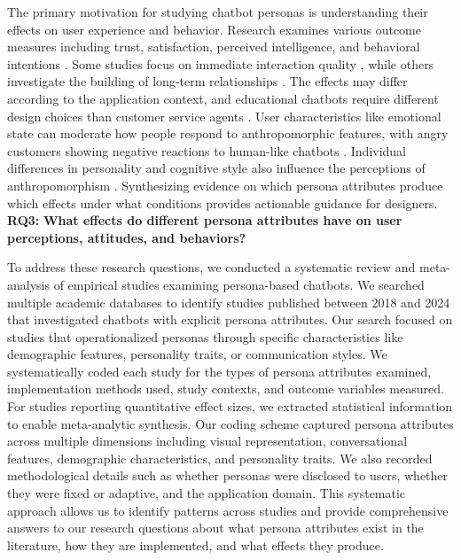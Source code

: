 \documentclass{article}
\begin{document}
The primary motivation for studying chatbot personas is understanding their effects on user experience and behavior. Research examines various outcome measures including trust, satisfaction, perceived intelligence, and behavioral intentions \citep{konya2023anthropomorphism,blut2021understanding}. Some studies focus on immediate interaction quality \citep{go2019humanizing}, while others investigate the building of long-term relationships \citep{xu2022beyond}. The effects may differ according to the application context, and educational chatbots require different design choices than customer service agents \citep{araujo2018living}. User characteristics like emotional state can moderate how people respond to anthropomorphic features, with angry customers showing negative reactions to human-like chatbots \citep{crolic2022blame}. Individual differences in personality and cognitive style also influence the perceptions of anthropomorphism \citep{spatola2021personality}. Synthesizing evidence on which persona attributes produce which effects under what conditions provides actionable guidance for designers. \textbf{RQ3:} \textbf{What effects do different persona attributes have on user perceptions, attitudes, and behaviors?}

To address these research questions, we conducted a systematic review and meta-analysis of empirical studies examining persona-based chatbots. We searched multiple academic databases to identify studies published between 2018 and 2024 that investigated chatbots with explicit persona attributes. Our search focused on studies that operationalized personas through specific characteristics like demographic features, personality traits, or communication styles. We systematically coded each study for the types of persona attributes examined, implementation methods used, study contexts, and outcome variables measured. For studies reporting quantitative effect sizes, we extracted statistical information to enable meta-analytic synthesis. Our coding scheme captured persona attributes across multiple dimensions including visual representation, conversational features, demographic characteristics, and personality traits. We also recorded methodological details such as whether personas were disclosed to users, whether they were fixed or adaptive, and the application domain. This systematic approach allows us to identify patterns across studies and provide comprehensive answers to our research questions about what persona attributes exist in the literature, how they are implemented, and what effects they produce.
\end{document}
